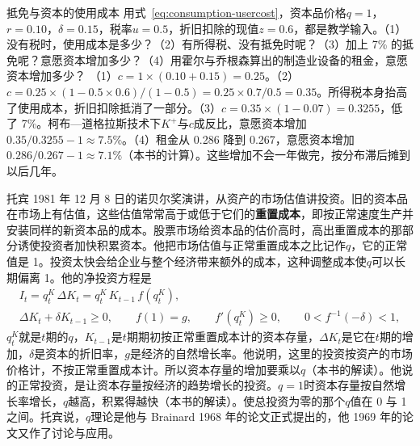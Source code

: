\begin{example}{抵免与资本的使用成本}\label{ex:consumption-usercost}
用式~\eqref{eq:consumption-usercost}，资本品价格$q=1$，$r=0.10$，$\delta=0.15$，税率$u=0.5$，折旧扣除的现值$z=0.6$，都是教学输入。（1）没有税时，使用成本是多少？（2）有所得税、没有抵免时呢？（3）加上 7\% 的抵免呢？意愿资本增加多少？（4）用霍尔与乔根森算出的制造业设备的租金，意愿资本增加多少？
\solution
（1）$c=1\times(0.10+0.15)=0.25$。（2）$c=0.25\times(1-0.5\times0.6)/(1-0.5)=0.25\times0.7/0.5=0.35$。所得税本身抬高了使用成本，折旧扣除抵消了一部分。（3）$c=0.35\times(1-0.07)=0.3255$，低了 7\%。柯布—道格拉斯技术下$K^{+}$与$c$成反比，意愿资本增加$0.35/0.3255-1\approx7.5\%$。（4）租金从 0.286 降到 0.267，意愿资本增加$0.286/0.267-1\approx7.1\%$（本书的计算）\cite{hj1967}。这些增加不会一年做完，按分布滞后摊到以后几年。
\end{example}

托宾 1981 年 12 月 8 日的诺贝尔奖演讲，从资产的市场估值讲投资\cite{tobin1981}。旧的资本品在市场上有估值，这些估值常常高于或低于它们的\textbf{重置成本}，即按正常速度生产并安装同样的新资本品的成本\cite{tobin1981}。股票市场给资本品的估价高时，高出重置成本的那部分诱使投资者加快积累资本\cite{tobin1981}。他把市场估值与正常重置成本之比记作$q$，它的正常值是 1\cite{tobin1981}。投资太快会给企业与整个经济带来额外的成本，这种调整成本使$q$可以长期偏离 1\cite{tobin1981}。他的净投资方程是
\begin{equation}
\begin{gathered}
I_t=q_t^K\,\Delta K_t=q_t^K\,K_{t-1}\,f(q_t^K),\\
\Delta K_t+\delta K_{t-1}\ge0,\qquad f(1)=g,\qquad f'(q_t^K)\ge0,\qquad 0<f^{-1}(-\delta)<1,
\end{gathered}\label{eq:consumption-q}
\end{equation}
$q_t^K$就是$t$期的$q$，$K_{t-1}$是$t$期期初按正常重置成本计的资本存量，$\Delta K_t$是它在$t$期的增加，$\delta$是资本的折旧率，$g$是经济的自然增长率\cite{tobin1981}。他说明，这里的投资按资产的市场价格计，不按正常重置成本计\cite{tobin1981}。所以资本存量的增加要乘以$q$（本书的解读）。他说的正常投资，是让资本存量按经济的趋势增长的投资\cite{tobin1981}。$q=1$时资本存量按自然增长率增长，$q$越高，积累得越快（本书的解读）。使总投资为零的那个$q$值在 0 与 1 之间\cite{tobin1981}。托宾说，$q$理论是他与 Brainard 1968 年的论文正式提出的，他 1969 年的论文又作了讨论与应用\cite{tobin1981}。

